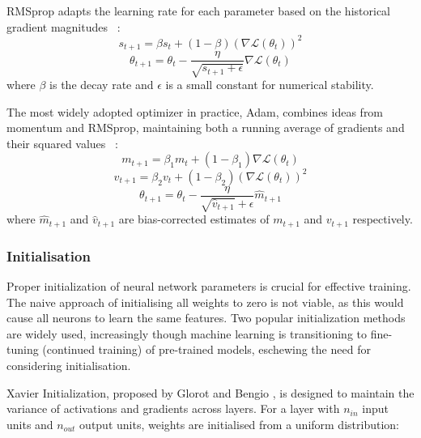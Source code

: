 \documentclass[a4paper, oneside]{discothesis}
\begin{document}
RMSprop adapts the learning rate for each parameter based on the historical gradient magnitudes ~\cite{kurbiel2017trainingdeepneuralnetworks}:
\begin{equation}
    s_{t+1} = \beta s_t + (1-\beta)(\nabla \mathcal{L}(\theta_t))^2
\end{equation}
\begin{equation}
    \theta_{t+1} = \theta_t - \frac{\eta}{\sqrt{s_{t+1} + \epsilon}} \nabla \mathcal{L}(\theta_t)
\end{equation}
where $\beta$ is the decay rate and $\epsilon$ is a small constant for numerical stability.

The most widely adopted optimizer in practice, Adam, combines ideas from momentum and RMSprop, maintaining both a running average of gradients and their squared values ~\cite{kingma2017adammethodstochasticoptimization}:
\begin{equation}
    m_{t+1} = \beta_1 m_t + (1-\beta_1)\nabla \mathcal{L}(\theta_t)
\end{equation}
\begin{equation}
    v_{t+1} = \beta_2 v_t + (1-\beta_2)(\nabla \mathcal{L}(\theta_t))^2
\end{equation}
\begin{equation}
    \theta_{t+1} = \theta_t - \frac{\eta}{\sqrt{\hat{v}_{t+1}} + \epsilon} \hat{m}_{t+1}
\end{equation}
where $\hat{m}_{t+1}$ and $\hat{v}_{t+1}$ are bias-corrected estimates of $m_{t+1}$ and $v_{t+1}$ respectively.

\subsubsection{Initialisation}

Proper initialization of neural network parameters is crucial for effective training. The naive approach of initialising all weights to zero is not viable, as this would cause all neurons to learn the same features. Two popular initialization methods are widely used, increasingly though machine learning is transitioning to fine-tuning (continued training) of pre-trained models, eschewing the need for considering initialisation. 

Xavier Initialization, proposed by Glorot and Bengio \cite{glorot2010understanding}, is designed to maintain the variance of activations and gradients across layers. For a layer with $n_{in}$ input units and $n_{out}$ output units, weights are initialised from a uniform distribution:
\end{document}
